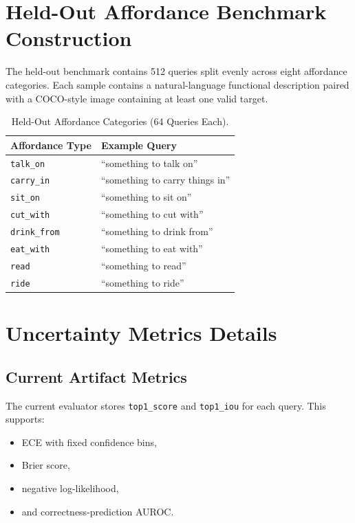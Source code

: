 \documentclass{uai2026} %
\begin{document}
\section{Held-Out Affordance Benchmark Construction}\label{app:benchmark}
The held-out benchmark contains 512 queries split evenly across eight affordance categories. Each sample contains a natural-language functional description paired with a COCO-style image containing at least one valid target.

\begin{table}[h]
\centering
\caption{Held-Out Affordance Categories (64 Queries Each).}
\label{tab:aff-types}
\begin{tabular}{ll}
\toprule
Affordance Type & Example Query \\
\midrule
\texttt{talk\_on} & ``something to talk on'' \\
\texttt{carry\_in} & ``something to carry things in'' \\
\texttt{sit\_on} & ``something to sit on'' \\
\texttt{cut\_with} & ``something to cut with'' \\
\texttt{drink\_from} & ``something to drink from'' \\
\texttt{eat\_with} & ``something to eat with'' \\
\texttt{read} & ``something to read'' \\
\texttt{ride} & ``something to ride'' \\
\bottomrule
\end{tabular}
\end{table}

\section{Uncertainty Metrics Details}\label{app:uncertainty}
\subsection{Current Artifact Metrics}
The current evaluator stores \texttt{top1\_score} and \texttt{top1\_iou} for each query. This supports:
\begin{itemize}
\item ECE with fixed confidence bins,
\item Brier score,
\item negative log-likelihood,
\item and correctness-prediction AUROC.
\end{itemize}
\end{document}
